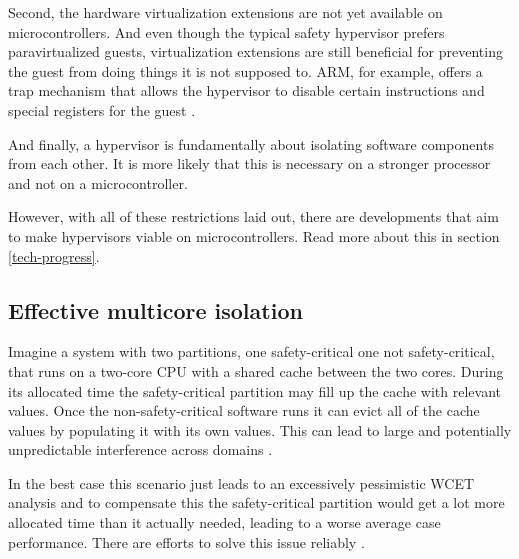 Second, the hardware virtualization extensions are not yet available on microcontrollers. And even though the typical safety hypervisor prefers paravirtualized guests, virtualization extensions are still beneficial for preventing the guest from doing things it is not supposed to. ARM, for example, offers a trap mechanism that allows the hypervisor to disable certain instructions and special registers for the guest \cite{ARM.v8.2018}. 

And finally, a hypervisor is fundamentally about isolating software components from each other. It is more likely that this is necessary on a stronger processor and not on a microcontroller.

However, with all of these restrictions laid out, there are developments that aim to make hypervisors viable on microcontrollers. Read more about this in section \ref{tech-progress}.

\subsection{Effective multicore isolation}
Imagine a system with two partitions, one safety-critical one not safety-critical, that runs on a two-core \gls{CPU} with a shared cache between the two cores. During its allocated time the safety-critical partition may fill up the cache with relevant values. Once the non-safety-critical software runs it can evict all of the cache values by populating it with its own values. This can lead to large and potentially unpredictable interference across domains \cite{AlessandroBiondi.2018}.

In the best case this scenario just leads to an excessively pessimistic \gls{WCET} analysis and to compensate this the safety-critical partition would get a lot more allocated time than it actually needed, leading to a worse average case performance. There are efforts to solve this issue reliably \cite{PaoloModica.2018}.


